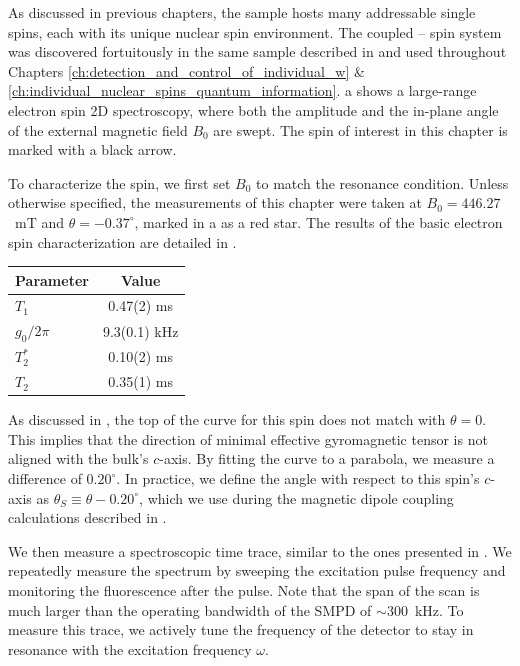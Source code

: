 As discussed in previous chapters, the sample hosts many addressable single \Er spins, each with its unique nuclear spin environment. The coupled \Nb -- \Er spin system was discovered fortuitously in the same \Ca sample described in  and used throughout Chapters \ref{ch:detection_and_control_of_individual_w} \& \ref{ch:individual_nuclear_spins_quantum_information}. a shows a large-range electron spin 2D spectroscopy, where both the amplitude and the in-plane angle of the external magnetic field $B_0$ are swept. The spin of interest in this chapter is marked with a black arrow. 

To characterize the \Er spin, we first set $B_0$ to match the resonance condition. Unless otherwise specified, the measurements of this chapter were taken at $B_0=446.27$~mT and $\theta = -0.37^\circ$,  marked in a as a red star. The results of the basic electron spin characterization are detailed in .

\begin{margintable}
    \centering
    \begin{tabular}{l|c}
    Parameter & Value \\ \hline
    $T_1$        & 0.47(2) ms  \\ 
    $g_0/2\pi$   & 9.3(0.1) kHz \\ 
    $T^*_2$      & 0.10(2) ms   \\ 
    $T_2$        & 0.35(1) ms  \\
    \end{tabular}
    \caption[\Er characterization]{\Er characterization.}
\end{margintable}

As discussed in , the top of the curve for this spin does not match with $\theta=0$. This implies that the direction of minimal effective gyromagnetic tensor is not aligned with the bulk's $c$-axis. By fitting the curve to a parabola, we measure a difference of $0.20^\circ$. In practice, we define the angle with respect to this spin's $c$-axis as $\theta_S \equiv \theta - 0.20^\circ$, which we use during the magnetic dipole coupling calculations described in .

We then measure a spectroscopic time trace, similar to the ones presented in . We repeatedly measure the \Er spectrum by sweeping the excitation pulse frequency and monitoring the fluorescence after the pulse. Note that the span of the scan is much larger than the operating bandwidth of the SMPD of $\sim300$~kHz. To measure this trace, we actively tune the frequency of the detector to stay in resonance with the excitation frequency $\omega$.

